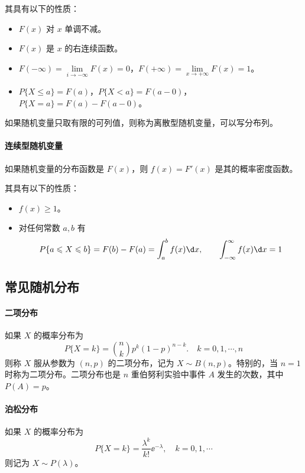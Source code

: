 其具有以下的性质：

\begin{itemize}
	\item $F(x)$ 对 $x$ 单调不减。
	\item $F(x)$ 是 $x$ 的右连续函数。
	\item $F(- \infty) = \lim\limits_{i \to -\infty} F(x) = 0$，$F(+\infty) = \lim\limits_{x \to + \infty} F(x) = 1$。
	\item $P\{X \leqslant a\} = F(a)$，$P\{X < a\} = F(a - 0)$，$P\{X = a\} = F(a) - F(a - 0)$。
\end{itemize}

如果随机变量只取有限的可列值，则称为离散型随机变量，可以写分布列。

\paragraph{连续型随机变量}

如果随机变量的分布函数是 $F(x)$，则 $f(x) = F'(x)$ 是其的概率密度函数。

其具有以下的性质：

\begin{itemize}
	\item $f(x) \geqslant 1$。
	\item 对任何常数 $a, b$ 有
	      \[ P\{a \leqslant X \leqslant b\} = F(b) - F(a) = \int_{a}^{b} f(x) \d x, \qquad \int_{-\infty}^{\infty} f(x) \d x = 1 \]
\end{itemize}

\subsection{常见随机分布}

\paragraph{二项分布}
如果 $X$ 的概率分布为
\[ P\{X = k\} = \binom{n}{k} p^k(1 - p)^{n-k}. \quad k = 0, 1, \cdots, n \]
则称 $X$ 服从参数为 $(n, p)$ 的二项分布，记为 $X \sim B(n, p)$。特别的，当 $n=1$ 时称为二项分布。二项分布也是 $n$ 重伯努利实验中事件 $A$ 发生的次数，其中 $P(A) = p$。

\paragraph{泊松分布}
如果 $X$ 的概率分布为
\[ P\{X = k\} = \frac{\lambda^k}{k!} \ee^{-\lambda} , \quad k = 0, 1, \cdots \]
则记为 $X \sim P(\lambda)$。

